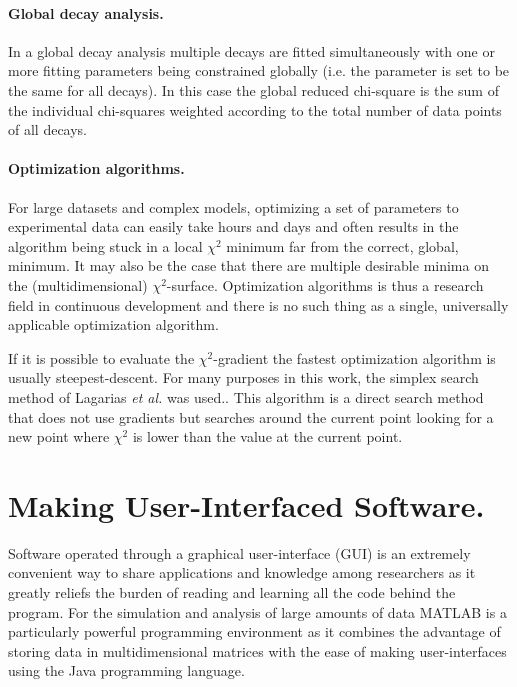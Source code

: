  \paragraph{Global decay analysis.} In a global decay analysis multiple decays are fitted simultaneously with one or more fitting parameters being constrained globally (i.e. the parameter is set to be the same for all decays). In this case the global reduced chi-square is the sum of the individual chi-squares weighted according to the total number of data points of all decays.

 \paragraph{Optimization algorithms.} For large datasets and complex models, optimizing a set of parameters to experimental data can easily take hours and days and often results in the algorithm being stuck in a local $\chi^2$ minimum far from the correct, global, minimum. It may also be the case that there are multiple desirable minima on the (multidimensional) $\chi^2$-surface. Optimization algorithms is thus a research field in continuous development and there is no such thing as a single, universally applicable optimization algorithm.

 If it is possible to evaluate the $\chi^2$-gradient the fastest optimization algorithm is usually steepest-descent. For many purposes in this work, the simplex search method of Lagarias \emph{et al.} was used.\cite{Lagarias1998}. This algorithm is a direct search method that does not use gradients but searches around the current point looking for a new point where $\chi^2$ is lower than the value at the current point.

\section{Making User-Interfaced Software.}
 Software operated through a graphical user-interface (GUI) is an extremely convenient way to share applications and knowledge among researchers as it greatly reliefs the burden of reading and learning all the code behind the program. For the simulation and analysis of large amounts of data MATLAB is a particularly powerful programming environment as it combines the advantage of storing data in multidimensional matrices with the ease of making user-interfaces using the Java programming language.\cite{MATLAB}


